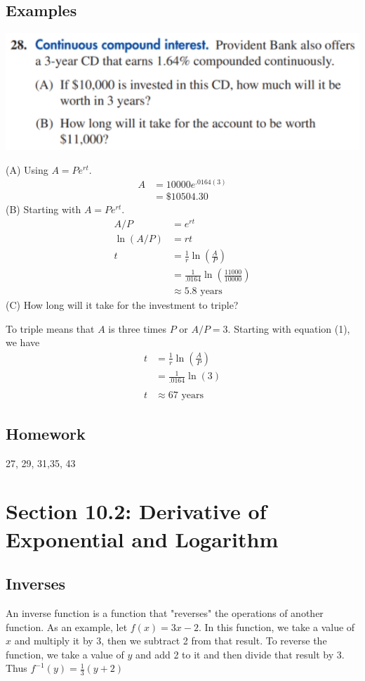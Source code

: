 \documentclass[14pt]{extarticle}
\begin{document}
\subsection{Examples}
\begin{center}
	\includegraphics[width=0.75\linewidth]{10-1-28}
\end{center}
(A) Using $A = Pe^{rt}$.
\begin{align*}
	A &= 10000e^{.0164(3)} \\
	&=\$10504.30
\end{align*}
(B) Starting with $A = Pe^{rt}$.
\begin{align*}
	A/P &= e^{rt} \\
	\ln(A/P)&=rt \\
	t &= \frac{1}{r} \ln(\frac{A}{P}) \tag{1}\\
	&= \frac{1}{.0164} \ln(\frac{11000}{10000}) \\
	&\approx 5.8 \text{ years}
\end{align*}
(C) How long will it take for the investment to triple?

To triple means that $A$ is three times $P$ or $A/P = 3$. Starting with equation (1), we have 
\begin{align*}
	t &= \frac{1}{r} \ln(\frac{A}{P}) \\
	&= \frac{1}{.0164} \ln(3) \\\\
	t&\approx 67 \text{ years}
\end{align*}

\subsection{Homework}
27, 29, 31,35, 43


\cleardoublepage
\section{Section 10.2: Derivative of Exponential and Logarithm}

\subsection{Inverses}
An inverse function is a function that "reverses" the operations of another function. As an example, let $f(x) = 3x-2$. In this function, we take a value of $x$ and multiply it by 3, then we subtract 2 from that result. To reverse the function, we take a value of $y$ and add 2 to it and then divide that result by 3. Thus $f^{-1}(y) = \frac{1}{3}(y+2)$
\end{document}
